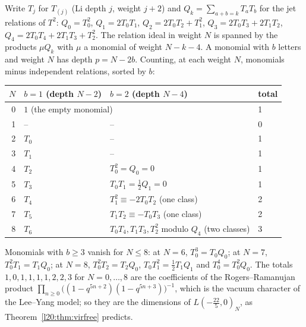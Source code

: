 \begin{example}[{$m=1$: $\ltwentyJ(\C[T]/(T^2))$ against $L(-\frac{22}{5},0)$}]\label{l20:ex:leeyang}
Write $T_j$ for $T_{(j)}$ (Li depth $j$, weight $j+2$) and $Q_k=\sum_{a+b=k}T_aT_b$ for the jet relations of $T^2$:
$Q_0=T_0^2$, $Q_1=2T_0T_1$, $Q_2=2T_0T_2+T_1^2$, $Q_3=2T_0T_3+2T_1T_2$, $Q_4=2T_0T_4+2T_1T_3+T_2^2$. The relation ideal in
weight $N$ is spanned by the products $\mu Q_k$ with $\mu$ a monomial of weight $N-k-4$. A monomial with $b$ letters and weight $N$
has depth $p=N-2b$. Counting, at each weight $N$, monomials minus independent relations, sorted by $b$:
\begin{center}
\begin{tabular}{rlll}
\toprule
$N$ & $b=1$ (depth $N-2$) & $b=2$ (depth $N-4$) & total\\
\midrule
0 & \multicolumn{2}{l}{$1$ (the empty monomial)} & 1\\
1 & -- & -- & 0\\
2 & $T_0$ & -- & 1\\
3 & $T_1$ & -- & 1\\
4 & $T_2$ & $T_0^2=Q_0=0$ & 1\\
5 & $T_3$ & $T_0T_1=\frac12Q_1=0$ & 1\\
6 & $T_4$ & $T_1^2\equiv-2T_0T_2$ (one class) & 2\\
7 & $T_5$ & $T_1T_2\equiv-T_0T_3$ (one class) & 2\\
8 & $T_6$ & $T_0T_4,T_1T_3,T_2^2$ modulo $Q_4$ (two classes) & 3\\
\bottomrule
\end{tabular}
\end{center}
Monomials with $b\ge3$ vanish for $N\le8$: at $N=6$, $T_0^3=T_0Q_0$; at $N=7$, $T_0^2T_1=T_1Q_0$; at $N=8$, $T_0^2T_2=T_2Q_0$,
$T_0T_1^2=\frac12T_1Q_1$ and $T_0^4=T_0^2Q_0$. The totals $1,0,1,1,1,1,2,2,3$ for $N=0,\dots,8$ are the coefficients of the
Rogers--Ramanujan product $\prod_{n\ge0}\bigl((1-q^{5n+2})(1-q^{5n+3})\bigr)^{-1}$, which is the vacuum character of the Lee--Yang
model; so they are the dimensions of $L(-\frac{22}5,0)_N$, as Theorem~\ref{l20:thm:virfree} predicts.


\end{example}
